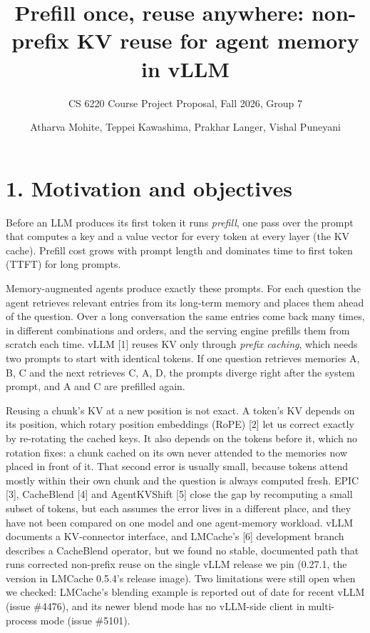\documentclass[
  10pt,
]{article}
\title{Prefill once, reuse anywhere: non-prefix KV reuse for agent
memory in vLLM}
\subtitle{CS 6220 Course Project Proposal, Fall 2026, Group 7}
\author{Atharva Mohite, Teppei Kawashima, Prakhar Langer, Vishal
Puneyani}
\date{}
\begin{document}
\maketitle

\section{1. Motivation and objectives}\label{motivation-and-objectives}

Before an LLM produces its first token it runs \emph{prefill}, one pass
over the prompt that computes a key and a value vector for every token
at every layer (the KV cache). Prefill cost grows with prompt length and
dominates time to first token (TTFT) for long prompts.

Memory-augmented agents produce exactly these prompts. For each question
the agent retrieves relevant entries from its long-term memory and
places them ahead of the question. Over a long conversation the same
entries come back many times, in different combinations and orders, and
the serving engine prefills them from scratch each time. vLLM {[}1{]}
reuses KV only through \emph{prefix caching}, which needs two prompts to
start with identical tokens. If one question retrieves memories A, B, C
and the next retrieves C, A, D, the prompts diverge right after the
system prompt, and A and C are prefilled again.

Reusing a chunk's KV at a new position is not exact. A token's KV
depends on its position, which rotary position embeddings (RoPE) {[}2{]}
let us correct exactly by re-rotating the cached keys. It also depends
on the tokens before it, which no rotation fixes: a chunk cached on its
own never attended to the memories now placed in front of it. That
second error is usually small, because tokens attend mostly within their
own chunk and the question is always computed fresh. EPIC {[}3{]},
CacheBlend {[}4{]} and AgentKVShift {[}5{]} close the gap by recomputing
a small subset of tokens, but each assumes the error lives in a
different place, and they have not been compared on one model and one
agent-memory workload. vLLM documents a KV-connector interface, and
LMCache's {[}6{]} development branch describes a CacheBlend operator,
but we found no stable, documented path that runs corrected non-prefix
reuse on the single vLLM release we pin (0.27.1, the version in
LMCache 0.5.4's release image). Two limitations were still open
when we checked: LMCache's blending example is reported out of date for
recent vLLM (issue \#4476), and its newer blend mode has no vLLM-side
client in multi-process mode (issue \#5101).
\end{document}
